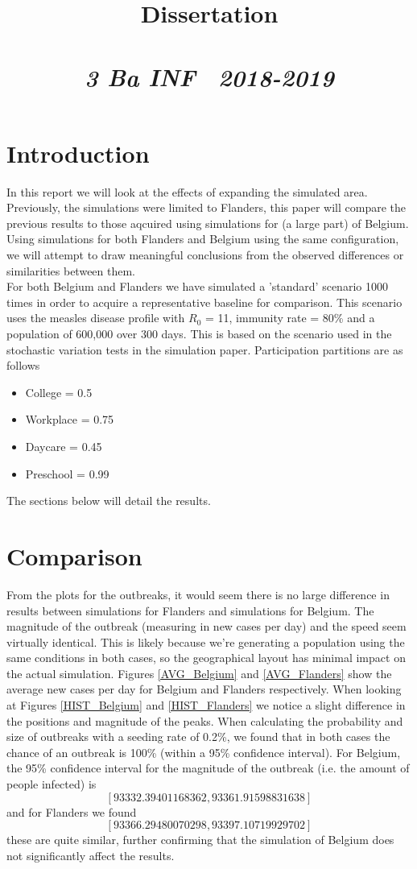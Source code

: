 \documentclass{article}
\title{\textmd{\textbf{Dissertation}}\\\normalsize\vspace{0.1in}\Large{\assignmentname}\\\vspace{0.1in}\small{\textit{3 Ba INF \  2018-2019}}}
\author{\studentA}
\date{}
\begin{document}
\maketitle

\section{Introduction}
In this report we will look at the effects of expanding the simulated area. Previously, the simulations were limited to Flanders, this paper will compare the previous results to those aqcuired using simulations for (a large part) of Belgium. Using simulations for both Flanders and Belgium using the same configuration, we will attempt to draw meaningful conclusions from the observed differences or similarities between them. \\
For both Belgium and Flanders we have simulated a 'standard' scenario 1000 times in order to acquire a representative baseline for comparison. This scenario uses the measles disease profile with $R_0$ = 11, immunity rate = 80\% and a population of 600,000 over 300 days. This is based on the scenario used in the stochastic variation tests in the simulation paper. Participation partitions are as follows
\begin{itemize}
	\item College = 0.5
	\item Workplace = 0.75
	\item Daycare = 0.45
	\item Preschool = 0.99
\end{itemize} 
The sections below will detail the results.


\section{Comparison}
From the plots for the outbreaks, it would seem there is no large difference in results between simulations for Flanders and simulations for Belgium. The magnitude of the outbreak (measuring in new cases per day) and the speed seem virtually identical. This is likely because we're generating a population using the same conditions in both cases, so the geographical layout has minimal impact on the actual simulation. Figures \ref{AVG_Belgium} and \ref{AVG_Flanders} show the average new cases per day for Belgium and Flanders respectively. When looking at Figures \ref{HIST_Belgium} and \ref{HIST_Flanders} we notice a slight difference in the positions and magnitude of the peaks. When calculating the probability and size of outbreaks with a seeding rate of 0.2\%, we found that in both cases the chance of an outbreak is 100\% (within a 95\% confidence interval). For Belgium, the 95\% confidence interval for the magnitude of the outbreak (i.e. the amount of people infected) is 
\[
	[93332.39401168362, 93361.91598831638]
\]
and for Flanders we found
\[
	[93366.29480070298, 93397.10719929702]
\]
these are quite similar, further confirming that the simulation of Belgium does not significantly affect the results.
\end{document}
